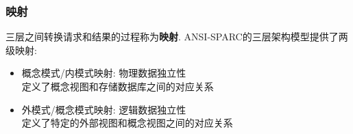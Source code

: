         \subsubsection{映射}

            三层之间转换请求和结果的过程称为\textbf{映射}. ANSI-SPARC的三层架构模型提供了两级映射:

            \begin{itemize}
                \item 概念模式/内模式映射: 物理数据独立性 \\
                    定义了概念视图和存储数据库之间的对应关系
                \item 外模式/概念模式映射: 逻辑数据独立性 \\
                    定义了特定的外部视图和概念视图之间的对应关系
            \end{itemize}

